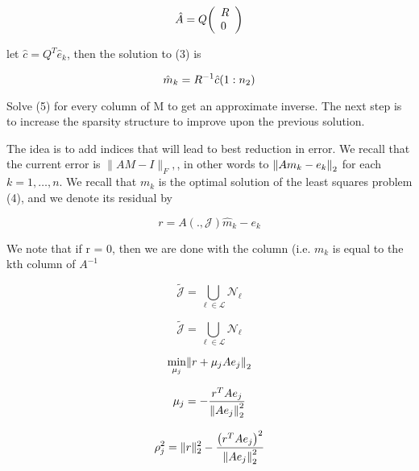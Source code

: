 \documentclass[paper=A4, fontsize=11pt]{scrartcl}
\let\originalleft\left
\let\originalright\right
\renewcommand{\left}{\mathopen{}\mathclose\bgroup\originalleft}
\renewcommand{\right}{\aftergroup\egroup\originalright}
\begin{document}
\begin{equation}
\hat{A}=Q\left(\begin{array}{l}{R} \\ {0}\end{array}\right)
\end{equation}

let \(\hat{c}=Q^{T} \hat{e}_{k}\), then the solution to (3) is 

\begin{equation}
\hat{m}_{k}=R^{-1} \hat{c}\left(1 : n_{2}\right)
\end{equation}

Solve (5) for every column of M to get an approximate inverse. The next 
step is to increase the sparsity structure to improve upon the previous solution.

The idea is to add indices that will lead to best reduction in error. We recall that the current error is \(\|A M-I\|_{F},\), in other words to \(\left\|A m_{k}-e_{k}\right\|_{2}\) for each \(k=1, \ldots, n .\) We recall that \(m_{k}\) is the optimal solution of the least squares problem (4), and we denote its residual by

\begin{equation}
r=A( ., \mathcal{J}) \hat{m}_{k}-e_{k}
\end{equation}

We note that if r = 0, then we are done with the column (i.e. \(m_{k}\) is equal to the kth column of $A^{-1}$


\begin{equation}
\tilde{\mathcal{J}}=\bigcup_{\ell \in \mathcal{L}} \mathcal{N}_{\ell}
\end{equation}

\begin{equation}
\tilde{\mathcal{J}}=\bigcup_{\ell \in \mathcal{L}} \mathcal{N}_{\ell}
\end{equation}

\begin{equation}
\min _{\mu_{j}}\left\|r+\mu_{j} A e_{j}\right\|_{2}
\end{equation}

\begin{equation}
\mu_{j}=-\frac{r^{T} A e_{j}}{\left\|A e_{j}\right\|_{2}^{2}}
\end{equation}

\begin{equation}
\rho_{j}^{2}=\|r\|_{2}^{2}-\frac{\left(r^{T} A e_{j}\right)^{2}}{\left\|A e_{j}\right\|_{2}^{2}}
\end{equation}
\end{document}
